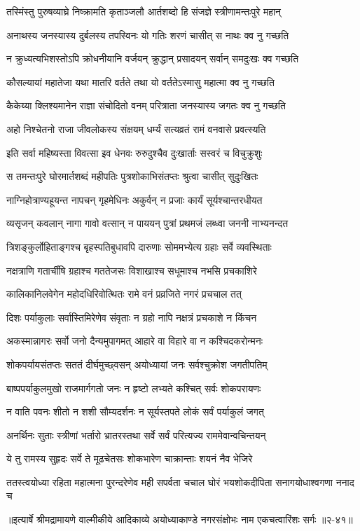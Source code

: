 
\twolineshloka
{तस्मिंस्तु पुरुषव्याघ्रे निष्क्रामति कृताञ्जलौ}
{आर्तशब्दो हि संजज्ञे स्त्रीणामन्तःपुरे महान्} %

\twolineshloka
{अनाथस्य जनस्यास्य दुर्बलस्य तपस्विनः}
{यो गतिः शरणं चासीत् स नाथः क्व नु गच्छति} %

\twolineshloka
{न क्रुध्यत्यभिशस्तोऽपि क्रोधनीयानि वर्जयन्}
{क्रुद्धान् प्रसादयन् सर्वान् समदुःखः क्व गच्छति} %

\twolineshloka
{कौसल्यायां महातेजा यथा मातरि वर्तते}
{तथा यो वर्ततेऽस्मासु महात्मा क्व नु गच्छति} %

\twolineshloka
{कैकेय्या क्लिश्यमानेन राज्ञा संचोदितो वनम्}
{परित्राता जनस्यास्य जगतः क्व नु गच्छति} %

\twolineshloka
{अहो निश्चेतनो राजा जीवलोकस्य संक्षयम्}
{धर्म्यं सत्यव्रतं रामं वनवासे प्रवत्स्यति} %

\twolineshloka
{इति सर्वा महिष्यस्ता विवत्सा इव धेनवः}
{रुरुदुश्चैव दुःखार्ताः सस्वरं च विचुक्रुशुः} %

\twolineshloka
{स तमन्तःपुरे घोरमार्तशब्दं महीपतिः}
{पुत्रशोकाभिसंतप्तः श्रुत्वा चासीत् सुदुःखितः} %

\twolineshloka
{नाग्निहोत्राण्यहूयन्त नापचन् गृहमेधिनः}
{अकुर्वन् न प्रजाः कार्यं सूर्यश्चान्तरधीयत} %

\twolineshloka
{व्यसृजन् कवलान् नागा गावो वत्सान् न पाययन्}
{पुत्रां प्रथमजं लब्ध्वा जननी नाभ्यनन्दत} %

\twolineshloka
{त्रिशङ्कुर्लोहिताङ्गश्च बृहस्पतिबुधावपि}
{दारुणाः सोममभ्येत्य ग्रहाः सर्वे व्यवस्थिताः} %

\twolineshloka
{नक्षत्राणि गतार्चींषि ग्रहाश्च गततेजसः}
{विशाखाश्च सधूमाश्च नभसि प्रचकाशिरे} %

\twolineshloka
{कालिकानिलवेगेन महोदधिरिवोत्थितः}
{रामे वनं प्रव्रजिते नगरं प्रचचाल तत्} %

\twolineshloka
{दिशः पर्याकुलाः सर्वास्तिमिरेणेव संवृताः}
{न ग्रहो नापि नक्षत्रं प्रचकाशे न किंचन} %

\twolineshloka
{अकस्मान्नागरः सर्वो जनो दैन्यमुपागमत्}
{आहारे वा विहारे वा न कश्चिदकरोन्मनः} %

\twolineshloka
{शोकपर्यायसंतप्तः सततं दीर्घमुच्छ्वसन्}
{अयोध्यायां जनः सर्वश्चुक्रोश जगतीपतिम्} %

\twolineshloka
{बाष्पपर्याकुलमुखो राजमार्गगतो जनः}
{न हृष्टो लभ्यते कश्चित् सर्वः शोकपरायणः} %

\twolineshloka
{न वाति पवनः शीतो न शशी सौम्यदर्शनः}
{न सूर्यस्तपते लोकं सर्वं पर्याकुलं जगत्} %

\twolineshloka
{अनर्थिनः सुताः स्त्रीणां भर्तारो भ्रातरस्तथा}
{सर्वे सर्वं परित्यज्य राममेवान्वचिन्तयन्} %

\twolineshloka
{ये तु रामस्य सुहृदः सर्वे ते मूढचेतसः}
{शोकभारेण चाक्रान्ताः शयनं नैव भेजिरे} %

\twolineshloka
{ततस्त्वयोध्या रहिता महात्मना पुरन्दरेणेव मही सपर्वता}
{चचाल घोरं भयशोकदीपिता सनागयोधाश्वगणा ननाद च} %


॥इत्यार्षे श्रीमद्रामायणे वाल्मीकीये आदिकाव्ये अयोध्याकाण्डे नगरसंक्षोभः नाम एकचत्वारिंशः सर्गः ॥२-४१॥
